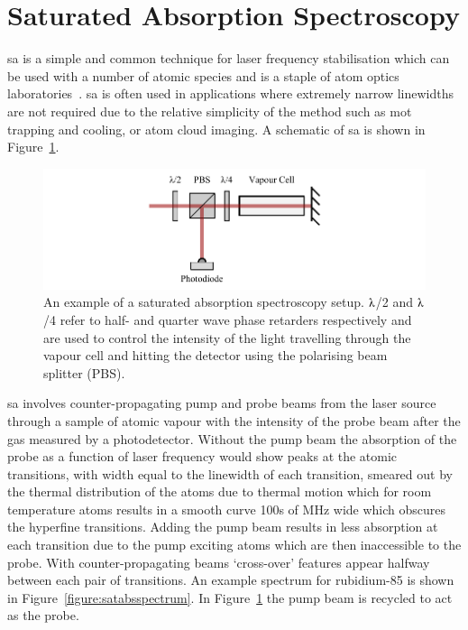 \section{Saturated Absorption Spectroscopy}
\Gls{sa} is a simple and common technique for laser frequency stabilisation which can be used with a number of atomic species and is a staple of atom optics laboratories~\cite{demtroder_laser_2003}.
\Gls{sa} is often used in applications where extremely narrow linewidths are not required due to the relative simplicity of the method such as \gls{mot} trapping and cooling, or atom cloud imaging.
A schematic of \gls{sa} is shown in Figure~\ref{figure:satabs}.

\begin{figure}
\center
\includegraphics{part1/Figs/SatAbs.pdf}
\caption{An example of a saturated absorption spectroscopy setup. $\lambdaup$/2 and $\lambdaup$/4 refer to half- and quarter wave phase retarders respectively and are used to control the intensity of the light travelling through the vapour cell and hitting the detector using the polarising beam splitter (PBS).}
\label{figure:satabs}
\end{figure}

\Gls{sa} involves counter-propagating pump and probe beams from the laser source through a sample of atomic vapour with the intensity of the probe beam after the gas measured by a photodetector.
Without the pump beam the absorption of the probe as a function of laser frequency would show peaks at the atomic transitions, with width equal to the linewidth of each transition, smeared out by the thermal distribution of the atoms due to thermal motion which for room temperature atoms results in a smooth curve 100s of MHz wide which obscures the hyperfine transitions.
Adding the pump beam results in less absorption at each transition due to the pump exciting atoms which are then inaccessible to the probe. With counter-propagating beams `cross-over' features appear halfway between each pair of transitions.
An example spectrum for rubidium-85 is shown in Figure~\ref{figure:satabsspectrum}.
In Figure~\ref{figure:satabs} the pump beam is recycled to act as the probe.

